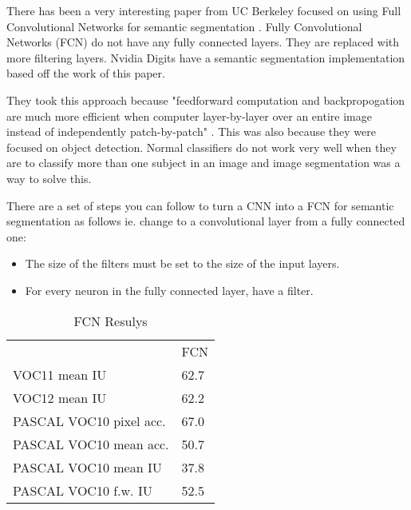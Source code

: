 There has been a very interesting paper from UC Berkeley focused on using Full Convolutional
Networks for semantic segmentation \textcite{fcn}. Fully Convolutional Networks
(FCN)
do not have any fully connected layers. They are replaced with more filtering
layers. Nvidia Digits have a semantic segmentation implementation based off the
work of this paper.

They took this approach because "feedforward computation and backpropogation are
much more efficient when computer layer-by-layer over an entire image instead of
independently patch-by-patch" \textcite{fcn}. This was also because they
were focused on object detection. Normal classifiers do not work very well when
they are to classify more than one subject in an image and image segmentation
was a way to solve this.

There are a set of steps you can follow to turn a CNN into a FCN for semantic
segmentation as follows ie. change to a convolutional layer from a fully
connected one:
\begin{itemize}
    \item{The size of the filters must be set to the size of the input layers.}
    \item{For every neuron in the fully connected layer, have a filter.}
\end{itemize}

\begin{table}[]
\centering
\caption{FCN Resulys \textcite{fcn}}
\label{fcn}
\begin{tabular}{ll}
                        & FCN  \\
VOC11 mean IU           & 62.7 \\
VOC12 mean IU           & 62.2 \\
PASCAL VOC10 pixel acc. & 67.0 \\
PASCAL VOC10 mean acc.  & 50.7 \\
PASCAL VOC10 mean IU    & 37.8 \\
PASCAL VOC10 f.w. IU    & 52.5
\end{tabular}
\end{table}
